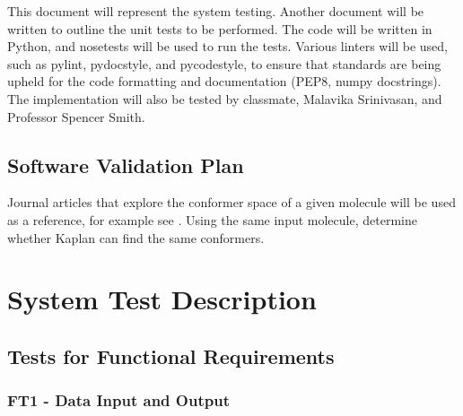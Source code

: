 \documentclass[12pt, titlepage]{article}
\newcommand{\progname}{Kaplan} %
\begin{document}
This document will represent the system testing. Another document will be
written to outline the unit tests to be performed.  The code will be
written in Python, and nosetests  will be used to run the tests. Various linters will be used, such
as pylint, pydocstyle, and pycodestyle, to ensure that standards are being
upheld for the code formatting and documentation (PEP8, numpy
docstrings).  The implementation will also be
tested by classmate, Malavika Srinivasan, and Professor Spencer Smith.


\subsection{Software Validation Plan}

Journal articles that explore the conformer space of a given molecule will be 
used as a reference, for example see \cite{butane-conformers}. Using the same 
input molecule, determine whether 
\progname{} can find the same conformers.



\section{System Test Description} \label{section-tests}
	
\subsection{Tests for Functional Requirements}


\subsubsection{FT1 - Data Input and Output}
\end{document}
